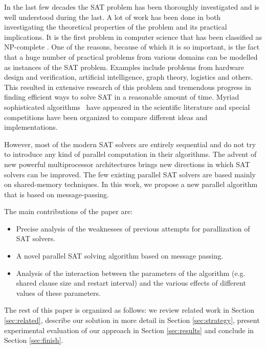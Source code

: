 \documentclass[letterpaper, compsoc, conference]{IEEEtran}
\begin{document}
In the last few decades the SAT problem has been thoroughly investigated 
and is well understood during the last. A lot of work has been done in both investigating the
theoretical properties of the problem and its practical implications. It is the
first problem in computer science that has been classified as NP-complete
\cite{Cook1971}. One of the reasons, because of which it is so important, is the
fact that a huge number of practical problems from various domains can be modelled
as instances of the SAT problem. Examples include problems from hardware design and
verification, artificial intelligence, graph theory, logistics and others. This 
resulted in extensive research of this problem and tremendous progress in finding 
efficient ways to solve SAT in a reasonable amount of time. Myriad sophisticated
algorithms~\cite{Davis1962,Selman1992,Zhang94sato,Selman95localsearch,PSATO,Bohm96,
Silva1997GRASP,Moskewicz2001Chaff,Forman02NagSat,MiniSat,Blochinger2003,Chrabakh03gradsat,
Jurkowiak2005,Lewis2007MiraXT,PMiniSat,Gil08Pmsat,ManySAT} have appeared in the 
scientific literature and special competitions \cite{SATRace2008} have been organized 
to compare different ideas and implementations.

However, most of the modern SAT solvers are entirely sequential and do not try 
to introduce any kind of parallel computation in their algorithms. The advent 
of new powerful multiprocessor architectures brings new directions in which SAT 
solvers can be improved. The few existing parallel SAT solvers are based 
mainly on shared-memory techniques. In this work, we propose a new parallel 
algorithm that is based on message-passing.

The main contributions of the paper are:
\begin{itemize}
\item Precise analysis of the weaknesses of previous attempts 
for parallization of SAT solvers.
\item A novel parallel SAT solving algorithm based on message passing.
\item Analysis of the interaction between the  parameters of the algorithm
(e.g. shared clause size and restart interval) and the various effects of different 
values of these parameters.
\end{itemize}
The rest of this paper is organized as follows: we review related work in
Section \ref{sec:related}, describe our solution in more detail in Section
\ref{sec:strategy}, present experimental evaluation of our approach in Section
\ref{sec:results} and conclude in Section \ref{sec:finish}.
\end{document}
